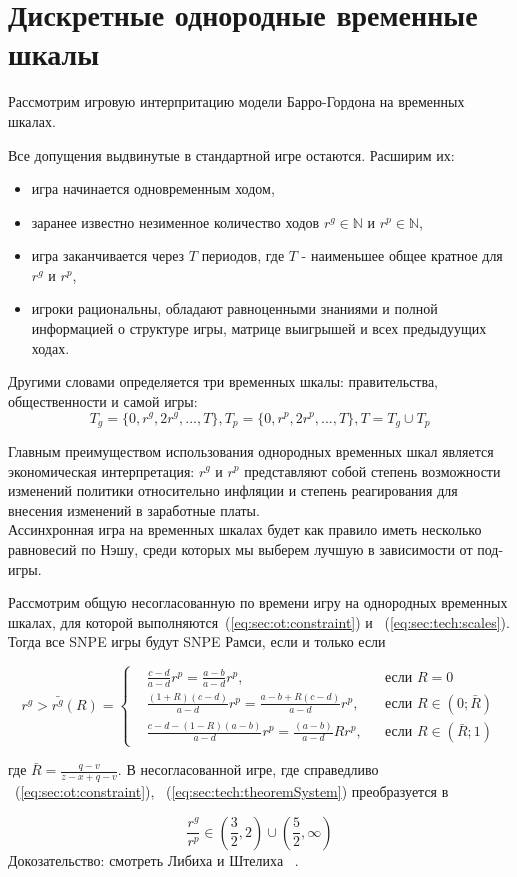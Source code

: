 
\section{Дискретные однородные временные шкалы} 

Рассмотрим игровую интерпритацию модели Барро-Гордона на временных шкалах.

Все допущения выдвинутые в стандартной игре остаются. Расширим их:
\begin{itemize}
\item игра начинается одновременным ходом, 
\item заранее известно незименное количество ходов $r^g \in \mathbb{N}$ и $r^p \in \mathbb{N}$,
\item игра заканчивается через $T$ периодов, где $T$ - наименьшее общее кратное для $r^g$ и $r^p$,
\item игроки рациональны, обладают равноценными знаниями и полной информацией о структуре игры, матрице выигрышей и всех предыдуущих ходах.
 \end{itemize}

Другими словами определяется три временных шкалы: правительства, общественности и самой игры:
\begin{equation}
\label{eq:sec:tech:scales}
T_g = \{0,r^g,2r^g,...,T\}, T_p=\{0,r^p,2r^p,...,T\}, T=T_g\cup T_p 
\end{equation}

Главным преимуществом использования однородных временных шкал является экономическая интерпретация: $r^g$ и $r^p$ представляют собой степень возможности изменений политики относительно инфляции и степень реагирования для внесения изменений в заработные платы.
\\

Ассинхронная игра на временных шкалах будет как правило иметь несколько равновесий по Нэшу, среди которых мы выберем лучшую в зависимости от под-игры.

\begin{theorem}
	Рассмотрим общую несогласованную по времени игру на однородных временных шкалах, для которой выполняются~(\ref{eq:sec:ot:constraint}) и ~(\ref{eq:sec:tech:scales}). Тогда все SNPE игры будут SNPE Рамси, если и только если
	
	\begin{equation}
		\label{eq:sec:tech:theoremSystem}
		r^g> \bar{r^g}(R) = \left\{ 
		\begin{aligned} 
			&\frac{c - d}{a-d}r^p= \frac{a-b}{a-d}r^p, &&\text{если } R=0
			\\
			&\frac{(1+R)(c-d)}{a-d}r^p= \frac{a-b + R(c-d)}{a-d}r^p, &&\text{если } 	R\in(0; \bar{R})
			\\
			&\frac{c-d-(1-R)(a-b)}{a-d}r^p= \frac{(a-b)}{a-d}Rr^p, &&\text{если } 	R\in(\bar{R};1)
		\end{aligned}
		\right.		
	\end{equation}
\end{theorem}
где $\bar{R}=\frac{q-v}{z-x+q-v}$. В несогласованной игре, где справедливо ~(\ref{eq:sec:ot:constraint}),  ~(\ref{eq:sec:tech:theoremSystem}) преобразуется в 

\begin{equation}
	\frac{r^g}{r^p} \in \left(\frac{3}{2}, 2\right)\cup \left(\frac{5}{2}, \infty\right)
\end{equation}
Докозательство: смотреть Либиха и Штелиха ~\cite{libichIncorpo}.